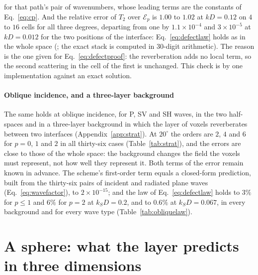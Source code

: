 \documentclass[preprint,review,12pt]{elsarticle}
\begin{document}
for that path's pair of wavenumbers, whose leading terms are the constants of Eq.~\eqref{eq:cp}. And
the relative error of $T_2$ over $\mathcal{E}_p$ is $1.00$ to $1.02$ at $kD=0.12$ on $4$ to $16$ cells
for all three degrees, departing from one by $1.1\times10^{-4}$ and $3\times10^{-5}$ at $kD=0.012$ for
the two positions of the interface: Eq.~\eqref{eq:defectlaw} holds as in the whole space
(; the exact stack is computed in $30$-digit
arithmetic). The reason is the one given for Eq.~\eqref{eq:defectproof}: the reverberation adds no
local term, so the second scattering in the cell of the first is unchanged. This check is by one
implementation against an exact solution.

\paragraph{Oblique incidence, and a three-layer background} The same holds at oblique incidence, for
P, SV and SH waves, in the two half-spaces and in a three-layer background in which the layer of voxels
reverberates between two interfaces (Appendix~\ref{app:strat}). At $20^\circ$ the orders are $2$, $4$
and $6$ for $p=0$, $1$ and $2$ in all thirty-six cases (Table~\ref{tab:strat}), and the errors are
close to those of the whole space: the background changes the field the voxels must represent, not how
well they represent it. Both terms of the error remain known in advance. The scheme's first-order term
equals a closed-form prediction, built from the thirty-six pairs of incident and radiated plane waves
(Eq.~\eqref{eq:wavefactor}), to $2\times10^{-15}$; and the law of Eq.~\eqref{eq:defectlaw} holds to
$3\%$ for $p\le1$ and $6\%$ for $p=2$ at $k_SD=0.2$, and to $0.6\%$ at $k_SD=0.067$, in every
background and for every wave type (Table~\ref{tab:obliquelaw}).

\FloatBarrier
\section{A sphere: what the layer predicts in three dimensions}\label{sec:sphere}
\end{document}
